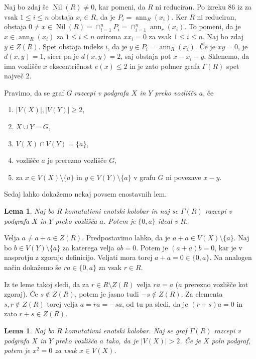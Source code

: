 \documentclass[a4paper, 12pt]{amsart}
\theoremstyle{definition} %
\theoremstyle{plain} %
\newtheorem{lema}[definicija]{Lema}
\DeclareMathOperator{\ann}{ann}
\DeclareMathOperator{\nil}{Nil}
\begin{document}
Naj bo zdaj še $\nil(R)\neq 0$, kar pomeni, da $R$ ni reduciran. Po izreku 86 iz \cite{Kaplansky} za vsak $1\le i \le n$ obstaja $x_i \in R$, da je $P_i = \ann_R(x_i)$. Ker $R$ ni reduciran, obstaja $0\neq x \in \nil(R) = \cap_{i=1}^n P_i = \cap_{i=1}^n \ann_r(x_i)$. To pomeni, da je $x\in \ann_R(x_i)$ za $ 1\le i \le n$ oziroma $x x_i = 0$ za vsak $1\le i \le n$. Naj bo zdaj $y\in Z(R)$. Spet obstaja indeks $i$, da je $y\in P_i = \ann_R(x_i)$. Če je $xy =0$, je $d(x,y)=1$, sicer pa je $d(x,y) = 2$, saj obstaja pot $x - x_i - y$. Sklenemo, da ima vozlišče $x$ ekscentričnost $e(x) \le 2$ in je  zato polmer grafa $\Gamma(R)$ spet največ 2.

\endproof

Pravimo, da se graf $G$ \emph{razcepi v podgrafa $X$ in $Y$ preko vozlišča $a$}, če 
\begin{enumerate}
\item $|V(X)|,|V(Y)| \ge 2$,
\item $X\cup Y = G$,
\item $V(X) \cap V(Y) = \{a\}$,
\item vozlišče $a$ je prerezno vozlišče $G$,
\item za $x\in V(X)\setminus\{a\}$ in $y\in V(Y) \setminus \{a\}$ v grafu $G$ ni povezave $x-y$.
\end{enumerate}
Sedaj lahko dokažemo nekaj povsem enostavnih lem.

\begin{lema}
Naj bo $R$ komutativni enotski kolobar in naj se $\Gamma(R)$ razcepi v podgrafa $X$ in $Y$ preko vozlišča $a$. Potem je $\{0,a\}$ ideal v $R$.
\end{lema}

\proof
Velja $a \neq a+ a \in Z(R)$. Predpostavimo lahko, da je $a+a \in V(X) \setminus \{a\}$. Naj bo $b\in V(Y) \setminus \{a\}$ za katerega velja $ab = 0$. Potem je $(a+a)b = 0$, kar je v nasprotju z zgornjo definicijo. Veljati mora torej $a+a = 0 \in \{0,a\}$. Na analogen način dokažemo še $ra \in \{0,a\}$ za vsak $r\in R$.
\endproof

Iz te leme takoj sledi, da za $r\in R\setminus Z(R)$ velja $ra = a$ ($a$ prerezno vozlišče kot zgoraj). Če $s\notin Z(R)$, potem je jasno tudi $-s \notin Z(R)$. Za elementa $s,r\notin Z(R)$ torej velja $a=ra=-sa$, od tu pa sledi, da je $(r+s)a = 0$ in zato $r+s \in Z(R)$.

\begin{lema}
Naj bo $R$ komutativni enotski kolobar. Naj se graf $\Gamma(R)$ razcepi v podgrafa $X$ in $Y$ preko vozlišča $a$ tako, da je $|V(X)|>2$. Če je $X$ poln podgraf, potem je $x^2 = 0$ za vsak $x\in V(X)$.
\end{lema}
\end{document}
